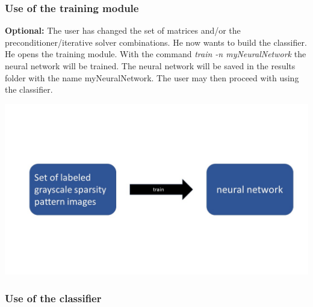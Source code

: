 \documentclass[parskip=full]{scrartcl}
\begin{document}
\subsubsection{Use of the \gls{training module}}
\textbf{Optional:} The user has changed the set of matrices and/or the \gls{preconditioner}/\gls{iterative solver} combinations. He now wants to build the \gls{classifier}. He opens the \gls{training module}. With the command \textit{train -n myNeuralNetwork} the \gls{neural network} will be trained. The \gls{neural network} will be saved in the results folder with the name myNeuralNetwork.  The user may then proceed with using the \gls{classifier}.

\begin{center}
\includegraphics[width=\textwidth]{trainingModule}
\end{center}

\subsubsection{Use of the classifier}
\end{document}
